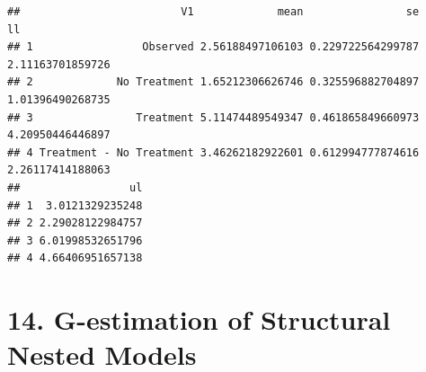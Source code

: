 \documentclass[
  10pt,
]{book}
\newenvironment{Shaded}{\begin{snugshade}}{\end{snugshade}}
\newcommand{\CommentTok}[1]{\textcolor[rgb]{0.56,0.35,0.01}{\textit{#1}}}
\newcommand{\DataTypeTok}[1]{\textcolor[rgb]{0.13,0.29,0.53}{#1}}
\newcommand{\DecValTok}[1]{\textcolor[rgb]{0.00,0.00,0.81}{#1}}
\newcommand{\FloatTok}[1]{\textcolor[rgb]{0.00,0.00,0.81}{#1}}
\newcommand{\KeywordTok}[1]{\textcolor[rgb]{0.13,0.29,0.53}{\textbf{#1}}}
\newcommand{\NormalTok}[1]{#1}
\newcommand{\OperatorTok}[1]{\textcolor[rgb]{0.81,0.36,0.00}{\textbf{#1}}}
\newcommand{\StringTok}[1]{\textcolor[rgb]{0.31,0.60,0.02}{#1}}
\begin{document}
\begin{Shaded}
\end{Shaded}

\begin{verbatim}
##                         V1             mean                se               ll
## 1                 Observed 2.56188497106103 0.229722564299787 2.11163701859726
## 2             No Treatment 1.65212306626746 0.325596882704897 1.01396490268735
## 3                Treatment 5.11474489549347 0.461865849660973 4.20950446446897
## 4 Treatment - No Treatment 3.46262182922601 0.612994777874616 2.26117414188063
##                 ul
## 1  3.0121329235248
## 2 2.29028122984757
## 3 6.01998532651796
## 4 4.66406951657138
\end{verbatim}

\hypertarget{g-estimation-of-structural-nested-models}{%
\chapter*{14. G-estimation of Structural Nested Models}\label{g-estimation-of-structural-nested-models}}
\end{document}
